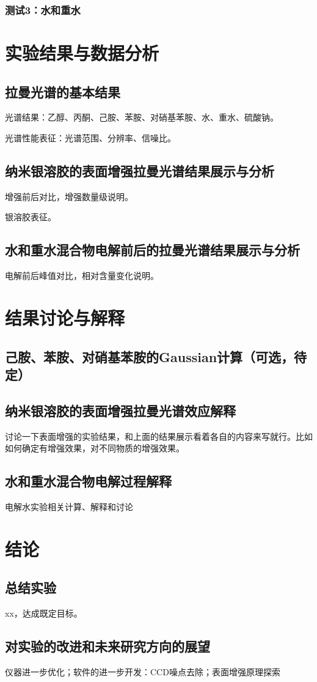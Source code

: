 \documentclass[UTF8]{article}
\begin{document}
	\subsubsection{测试3：水和重水}

	
	\section{实验结果与数据分析}
	\subsection{拉曼光谱的基本结果}
	光谱结果：乙醇、丙酮、己胺、苯胺、对硝基苯胺、水、重水、硫酸钠。

	光谱性能表征：光谱范围、分辨率、信噪比。

	\subsection{纳米银溶胶的表面增强拉曼光谱结果展示与分析}
	增强前后对比，增强数量级说明。

	银溶胶表征。

	\subsection{水和重水混合物电解前后的拉曼光谱结果展示与分析}
	电解前后峰值对比，相对含量变化说明。

	
	\section{结果讨论与解释}
	\subsection{己胺、苯胺、对硝基苯胺的Gaussian计算（可选，待定）}
	

	\subsection{纳米银溶胶的表面增强拉曼光谱效应解释}
	讨论一下表面增强的实验结果，和上面的结果展示看着各自的内容来写就行。比如如何确定有增强效果，对不同物质的增强效果。

	\subsection{水和重水混合物电解过程解释 }
	电解水实验相关计算、解释和讨论
	
	\section{结论}
	\subsection{总结实验}
	xx，达成既定目标。

	\subsection{对实验的改进和未来研究方向的展望}
	仪器进一步优化；软件的进一步开发：CCD噪点去除；表面增强原理探索
	
	
	
	


	
\end{document}
